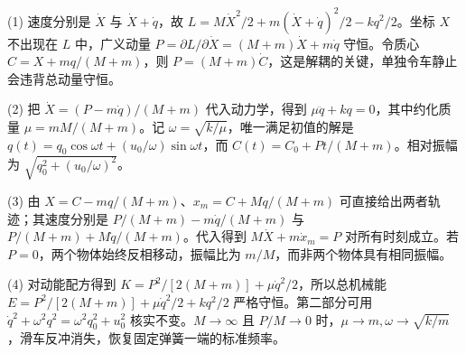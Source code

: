 (1) 速度分别是 \(\dot X\) 与 \(\dot X+\dot q\)，故 \(L=M\dot X^2/2+m(\dot X+\dot q)^2/2-kq^2/2\)。坐标 \(X\) 不出现在 \(L\) 中，广义动量 \(P=\partial L/\partial\dot X=(M+m)\dot X+m\dot q\) 守恒。令质心 \(C=X+mq/(M+m)\)，则 \(P=(M+m)\dot C\)，这是解耦的关键，单独令车静止会违背总动量守恒。

(2) 把 \(\dot X=(P-m\dot q)/(M+m)\) 代入动力学，得到 \(\mu\ddot q+kq=0\)，其中约化质量 \(\mu=mM/(M+m)\)。记 \(\omega=\sqrt{k/\mu}\)，唯一满足初值的解是 \(q(t)=q_0\cos\omega t+(u_0/\omega)\sin\omega t\)，而 \(C(t)=C_0+Pt/(M+m)\)。相对振幅为 \(\sqrt{q_0^2+(u_0/\omega)^2}\)。

(3) 由 \(X=C-mq/(M+m)\)、\(x_m=C+Mq/(M+m)\) 可直接给出两者轨迹；其速度分别是 \(P/(M+m)-m\dot q/(M+m)\) 与 \(P/(M+m)+M\dot q/(M+m)\)。代入得到 \(M\dot X+ m\dot x_m=P\) 对所有时刻成立。若 \(P=0\)，两个物体始终反相移动，振幅比为 \(m/M\)，而非两个物体具有相同振幅。

(4) 对动能配方得到 \(K=P^2/[2(M+m)]+\mu\dot q^2/2\)，所以总机械能 \(E=P^2/[2(M+m)]+\mu\dot q^2/2+kq^2/2\) 严格守恒。第二部分可用 \(\dot q^2+\omega^2q^2=\omega^2q_0^2+u_0^2\) 核实不变。\(M\to\infty\) 且 \(P/M\to0\) 时，\(\mu\to m,\omega\to\sqrt{k/m}\)，滑车反冲消失，恢复固定弹簧一端的标准频率。

